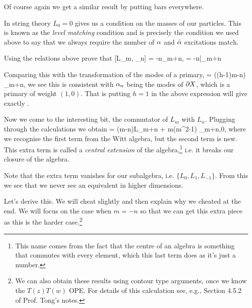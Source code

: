 Of course again we get a similar result by putting bars everywhere. 

\br 
    In string theory $L_0=0$ gives us a condition on the masses of our particles. This is known as the \textit{level matching} condition and is precisely the condition we used above to say that we always require the number of $\alpha$ and $\bar{\alpha}$ excitations match. 
\er 

\bbox 
    Using the relations above prove that 
    \be 
    \label{eqn:LalphaCommutator}
        [L_m, \a_n] = -n\a_{m+n},  = -n\bar{\a}_{m+n}
    \ee 
\ebox 

Comparing this with the transformation of the modes of a primary,
\bse 
    [L_m,\varphi_n] = \big((h-1)m-n\big) \varphi_{m+n},
\ese 
we see this is consistent with $\alpha_n$ being the modes of $\partial X$, which is a primary of weight $(1,0)$. That is putting $h=1$ in the above expression will give exactly .

Now we come to the interesting bit, the commutator of $L_m$ with $L_n$. Plugging through the calculations we obtain
\bse 
    [L_m,L_n] = (m-n)L_{m+n} +  m(m^2-1) \del_{m+n,0},
\ese
where we recognise the first term from the Witt algebra, but the second term is new. This extra term is called a \textit{central extension} of the algebra,\footnote{This name comes from the fact that the centre of an algebra is something that commutes with every element, which this last term does as it's just a number.} i.e. it breaks our closure of the algebra.

\br 
    Note that the extra term vanishes for our subalgebra, i.e. $\{L_0,L_1,L_{-1}\}$. From this we see that we never see an equivalent in higher dimensions. 
\er 

Let's derive this. We will cheat slightly and then explain why we cheated at the end. We will focus on the case when $m=-n$ so that we can get this extra piece as this is the harder case.\footnote{We can also obtain these results using contour type arguments, once we know the $T(z)T(w)$ OPE. For details of this calculation see, e.g., Section 4.5.2 of Prof. Tong's notes.}

